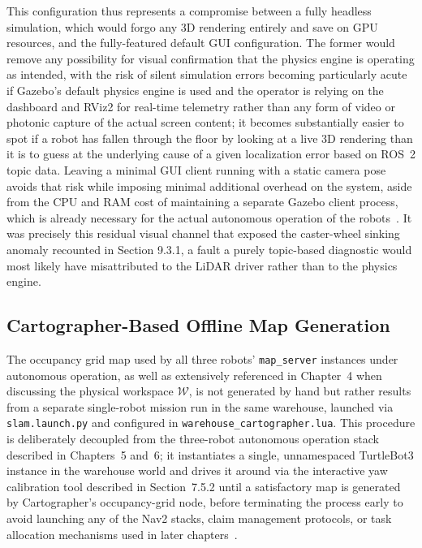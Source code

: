 This configuration thus represents a compromise between a fully headless simulation, which would forgo any 3D rendering entirely and save on GPU resources, and the fully-featured default GUI configuration. The former would remove any possibility for visual confirmation that the physics engine is operating as intended, with the risk of silent simulation errors becoming particularly acute if Gazebo's default physics engine is used and the operator is relying on the dashboard and RViz2 for real-time telemetry rather than any form of video or photonic capture of the actual screen content; it becomes substantially easier to spot if a robot has fallen through the floor by looking at a live 3D rendering than it is to guess at the underlying cause of a given localization error based on ROS~2 topic data. Leaving a minimal GUI client running with a static camera pose avoids that risk while imposing minimal additional overhead on the system, aside from the CPU and RAM cost of maintaining a separate Gazebo client process, which is already necessary for the actual autonomous operation of the robots~\cite{koenig2004design}. It was precisely this residual visual channel that exposed the caster-wheel sinking anomaly recounted in Section 9.3.1, a fault a purely topic-based diagnostic would most likely have misattributed to the LiDAR driver rather than to the physics engine.

\subsection{Cartographer-Based Offline Map Generation}

The occupancy grid map used by all three robots' \texttt{map\_server} instances under autonomous operation, as well as extensively referenced in Chapter~4 when discussing the physical workspace $\mathcal{W}$, is not generated by hand but rather results from a separate single-robot mission run in the same warehouse, launched via \texttt{slam.launch.py} and configured in \texttt{warehouse\_cartographer.lua}. This procedure is deliberately decoupled from the three-robot autonomous operation stack described in Chapters~5 and~6; it instantiates a single, unnamespaced TurtleBot3 instance in the warehouse world and drives it around via the interactive yaw calibration tool described in Section~7.5.2 until a satisfactory map is generated by Cartographer's occupancy-grid node, before terminating the process early to avoid launching any of the Nav2 stacks, claim management protocols, or task allocation mechanisms used in later chapters~\cite{macenski2020marathon}.

